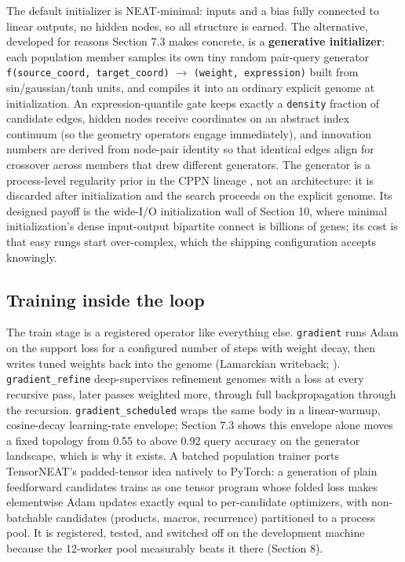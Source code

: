 \documentclass[11pt]{article}
\begin{document}
The default initializer is NEAT-minimal: inputs and a bias fully connected to linear outputs, no hidden nodes, so all structure is earned. The alternative, developed for reasons Section 7.3 makes concrete, is a \textbf{generative initializer}: each population member samples its own tiny random pair-query generator \texttt{f(source_coord, target_coord)} $\to$ \texttt{(weight, expression)} built from sin/gaussian/tanh units, and compiles it into an ordinary explicit genome at initialization. An expression-quantile gate keeps exactly a \texttt{density} fraction of candidate edges, hidden nodes receive coordinates on an abstract index continuum (so the geometry operators engage immediately), and innovation numbers are derived from node-pair identity so that identical edges align for crossover across members that drew different generators. The generator is a process-level regularity prior in the CPPN lineage \citep{stanley2007}, not an architecture: it is discarded after initialization and the search proceeds on the explicit genome. Its designed payoff is the wide-I/O initialization wall of Section 10, where minimal initialization's dense input-output bipartite connect is billions of genes; its cost is that easy rungs start over-complex, which the shipping configuration accepts knowingly.

\subsection{Training inside the loop}

The train stage is a registered operator like everything else. \texttt{gradient} runs Adam \citep{kingma2015} on the support loss for a configured number of steps with weight decay, then writes tuned weights back into the genome (Lamarckian writeback; \citealp{whitley1994}). \texttt{gradient_refine} deep-supervises refinement genomes with a loss at every recursive pass, later passes weighted more, through full backpropagation through the recursion. \texttt{gradient_scheduled} wraps the same body in a linear-warmup, cosine-decay learning-rate envelope; Section 7.3 shows this envelope alone moves a fixed topology from 0.55 to above 0.92 query accuracy on the generator landscape, which is why it exists. A batched population trainer ports TensorNEAT's padded-tensor idea \citep{wang2024tensorneat} natively to PyTorch: a generation of plain feedforward candidates trains as one tensor program whose folded loss makes elementwise Adam updates exactly equal to per-candidate optimizers, with non-batchable candidates (products, macros, recurrence) partitioned to a process pool. It is registered, tested, and switched off on the development machine because the 12-worker pool measurably beats it there (Section 8).
\end{document}
